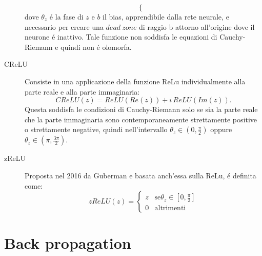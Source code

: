 \documentclass[a4paper,12pt]{report}
\begin{document}
\begin{description}
\begin{equation}
\begin{cases}
                                                                \end{cases}
 \end{equation}
 dove $\theta_z$ \'e la fase di $z$ e $b$ il bias, apprendibile dalla rete neurale, e necessario per creare una $dead \ zone$ di raggio b attorno all'origine dove il neurone \'e inattivo. Tale funzione non soddisfa le equazioni di Cauchy-Riemann e quindi non \'e olomorfa.
 
 \item[CReLU]
 Consiste in una applicazione della funzione ReLu individualmente alla parte reale e alla parte immaginaria:
 \begin{equation}
  CReLU\left( z\right) = ReLU\left( Re\left( z\right)\right) + i \, ReLU\left( Im\left( z\right)\right).
 \end{equation}
 Questa soddisfa le condizioni di Cauchy-Riemann solo se sia la parte reale che la parte immaginaria sono contemporaneamente strettamente positive o strettamente negative, quindi nell'intervallo $\theta_z \in \left( 0, \frac{\pi}{2}\right)$ oppure $\theta_z \in \left( \pi, \frac{ 3 \pi}{2}\right)$.
 
 \item[zReLU]
 Proposta nel 2016 da Guberman e basata anch'essa sulla ReLu, \'e definita come:
 \begin{equation}
   zReLU\left( z\right) = \begin{cases}
                                                                                               z & \mbox{se} \theta_z \in \left[ 0, \frac{ \pi}{2}\right] \\
                                                                                0 & \mbox{altrimenti}
                                                             
                                                     \end{cases}
 \end{equation}

\end{description}
 
 \section{Back propagation}
 
\end{document}
